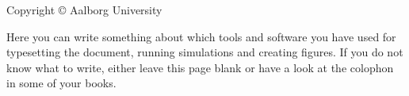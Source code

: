 \thispagestyle{empty}
{\small
\strut\vfill %
\noindent Copyright \copyright{} Aalborg University \the\year\par
\vspace{0.2cm}
\noindent Here you can write something about which tools and software you have used for typesetting the document, running simulations and creating figures. If you do not know what to write, either leave this page blank or have a look at the colophon in some of your books.
}
\clearpage

